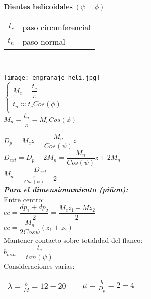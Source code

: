 \documentclass[11pt,a4paper]{article}
\begin{document}
\begin{multicols}{2}

	\textbf{Dientes helicoidales} $(\psi=\phi)$\\
	\begin{tabular}{r l}
		$t_c$& paso circunferencial\\
		$t_n$& paso normal\\
	\end{tabular}\\



		\begin{multicols}{2}
			\texttt{[image: engranaje-heli.jpg]}\\
			$\left\{\begin{array}{l}
				M_c=\dfrac{t_c}{\pi}\\
				t_n\approx t_c Cos(\phi)\\
			\end{array} \right.$\\
			$M_n=\dfrac{t_n}{\pi}=M_c Cos(\phi)$\\
		\end{multicols}
		

	$D_p=M_c z= \dfrac{M_n}{Cos(\psi)}z$\\
	$D_{ext}=D_p+2M_n =\dfrac{M_n}{Cos(\psi)}z+2M_n$\\
	$M_n=\dfrac{D_{ext}}{\frac{z}{Cos(\psi)}+2}$\\\vspace*{0.2cm}
	\textbf{\textit{Para el dimensionamiento (piñon):}}\\
	\textbullet Entre centro:\\\vspace*{0.2cm}
	$ec=\dfrac{dp_1+dp_2}{2}=\dfrac{M_c z_1+ M z_2}{2}$\\
	$ec=\dfrac{M_n}{2 Cos{\psi}}(z_1+z_2)$\\
	\textbullet Mantener contacto sobre totalidad del flanco:\\
	$b_{min}=\dfrac{t_c}{tan(\psi)}$\\
	Consideraciones varias:\\
	\begin{tabular}{l r}
	$\lambda=\frac{b}{M}= 12 - 20~~~~~$&
	$\mu=\frac{b}{D_p}=2 - 4~~~~~$\\
	\end{tabular}


\end{multicols}
\end{document}
